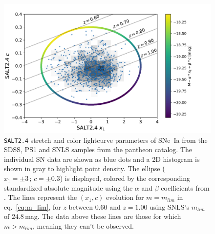 \documentclass[]{aa} %
\newcommand{\nn}[1]{{\textcolor[rgb]{1, 0.27, 0}{#1}}}
\begin{document}
\begin{figure}
    \centering
    \includegraphics[width=0.95\linewidth]{Article_figures/zmax_maglim_snls.pdf}
    \caption{\textsc{\texttt{SALT2.4}} stretch and color lightcurve parameters
        of SNe~Ia from the SDSS, PS1 and SNLS samples from the pantheon catalog.
        The individual SN data are shown as blue dots and a 2D histogram is
        shown in gray to highlight point density. The ellipse
        ($x_1=\pm3\,\mathrm{;}\,c=\pm0.3$) is displayed, colored by the
        corresponding standardized absolute magnitude using the $\alpha$ and
        $\beta$ coefficients from \cite{scolnic2018a}. \nn{The lines represent
        the $(x_1, c)$ evolution for $m = m_{lim}$ in eq.~\ref{eq:m_lim},
    for $z$ between $0.60$ and $z=1.00$ using SNLS's $m_{lim}$ of $24.8\,$mag. The data
    above these lines are those for which $m > m_{lim}$, meaning they can't be
    observed.}}
    \label{fig:maglim}
\end{figure}
\end{document}
